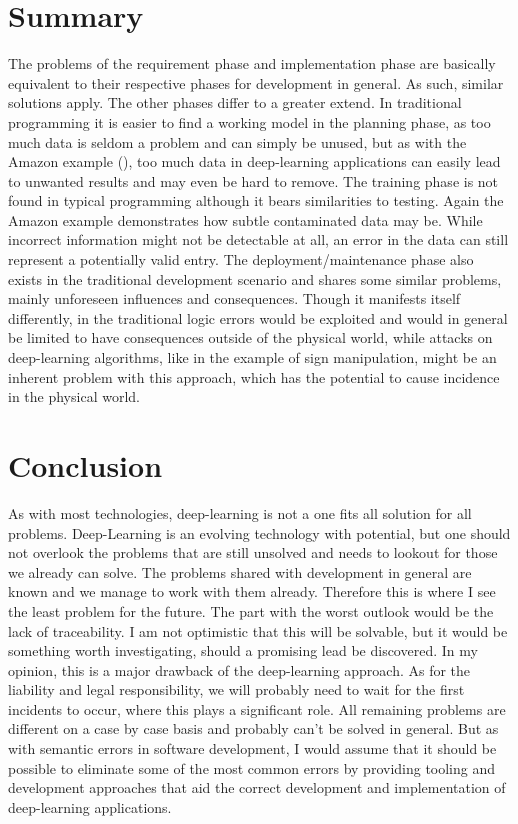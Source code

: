\section{Summary}

The problems of the requirement phase and implementation phase are basically equivalent to their respective phases for development in general. As such, similar solutions apply. The other phases differ to a greater extend. In traditional programming it is easier to find a working model in the planning phase, as too much data is seldom a problem and can simply be unused, but as with the Amazon example (\cite{Higginbottom2018}), too much data in deep-learning applications can easily lead to unwanted results and may even be hard to remove.
The training phase is not found in typical programming although it bears similarities to testing. Again the Amazon example demonstrates how subtle contaminated data may be. While incorrect information might not be detectable at all, an error in the data can still represent a potentially valid entry. The deployment/maintenance phase also exists in the traditional development scenario and shares some similar problems, mainly unforeseen influences and consequences. Though it manifests itself differently, in the traditional logic errors would be exploited and would in general be limited to have consequences outside of the physical world,
while attacks on deep-learning algorithms, like in the example of sign manipulation,
might be an inherent problem with this approach, which has the potential to cause incidence in the physical world. 

\section{Conclusion}
As with most technologies, deep-learning is not a one fits all solution for all problems. Deep-Learning is an evolving technology with potential, but one should not overlook the problems that are still unsolved and needs to lookout for those we already can solve. The problems shared with development in general are known and we manage to work with them already. Therefore this is where I see the least problem for the future. The part with the worst outlook would be the lack of traceability. I am not optimistic that this will be solvable, but it would be something worth investigating, should a promising lead be discovered. In my opinion, this is a major drawback of the deep-learning approach. As for the liability and legal responsibility, we will probably need to wait for the first incidents to occur, where this plays a significant role. All remaining problems are different on a case by case basis and probably can't be solved in general. But as with semantic errors in software development, I would assume that it should be possible to eliminate some of the most common errors by providing tooling and development approaches that aid the correct development and implementation of deep-learning applications.
